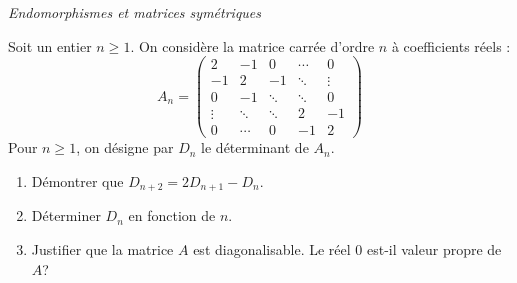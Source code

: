 \documentclass[a4paper,10pt]{report}
\begin{document}
\medskip

\begin{center}
\textit{{ {\large Endomorphismes et matrices symétriques}}}
\end{center}

\medskip

\begin{Exa} Soit un entier $n\geq 1.$ On consid\`{e}re la matrice carr\'{e}e d'ordre $n$ \`{a} coefficients r\'{e}els :
\begin{equation*}
A_n=\begin{pmatrix}
2 & -1 & 0 & \cdots & 0 \\ 
-1 & 2 & -1 & \ddots & \vdots \\ 
0 & -1 & \ddots & \ddots & 0 \\ 
\vdots & \ddots & \ddots & 2 & -1 \\ 
0 & \cdots & 0 & -1 & 2
\end{pmatrix}
\end{equation*}
Pour $n\geq 1$, on d\'{e}signe par $D_{n}$ le d\'{e}terminant de $A_n$.
\begin{enumerate}
\item Démontrer que $D_{n+2}=2D_{n+1}-D_{n}$.
\item D\'{e}terminer $D_{n}$ en fonction de $n$.
\item Justifier que la matrice $A$ est diagonalisable. Le r\'{e}el $0$ est-il valeur propre de $A$?
\end{enumerate}
\end{Exa}

\end{document}
